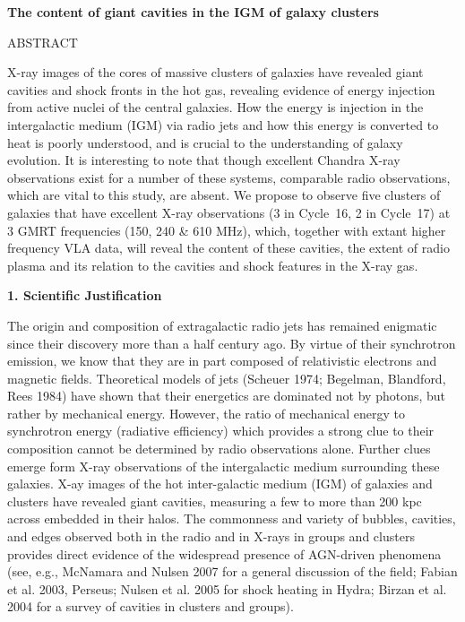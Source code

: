 \documentclass{article}
\begin{document}
 
%


\begin{center}
\large
{\bf The content of giant cavities in the IGM of galaxy clusters}
\normalsize
\end{center}

\bigskip



ABSTRACT {\sf


X-ray images of the cores of massive clusters of galaxies have
revealed giant cavities and shock fronts in the hot gas, revealing
evidence of energy injection from active nuclei of the central
galaxies. How the energy is injection in the intergalactic medium
(IGM) via radio jets and how this energy is converted to heat is
poorly understood, and is crucial to the understanding of galaxy
evolution.  It is interesting to note that though excellent Chandra
X-ray observations exist for a number of these systems, comparable 
radio observations, which are vital to this study,
are absent.
We propose to observe five clusters of galaxies that have
excellent X-ray observations (3 in Cycle~16, 2 in Cycle~17) at 3 GMRT
frequencies (150, 240 \& 610 MHz), which, together with extant higher
frequency VLA data, will reveal the content of these cavities, the
extent of radio plasma and its relation to the cavities and shock
features in the X-ray gas.


	} %





\bigskip


{\bf 1. Scientific Justification}






The origin and composition of extragalactic radio
jets has remained
enigmatic since their discovery more than a half century ago.  By
virtue of their synchrotron emission, we know that they are in part
composed of relativistic electrons and magnetic fields.  Theoretical
models of jets (Scheuer 1974; Begelman, Blandford, Rees 1984) have
shown that their energetics are dominated not by photons, but rather
by mechanical energy.  However, the ratio of mechanical energy to
synchrotron energy (radiative efficiency) which provides a strong clue
to their composition cannot be determined by radio observations alone.
Further clues emerge form X-ray observations of the intergalactic
medium surrounding these galaxies.  X-ay images of the  
hot inter-galactic medium (IGM) of 
galaxies and clusters have revealed giant cavities, measuring a few to
more than 200 kpc across embedded in their halos.  The commonness and
variety of bubbles, cavities, and edges observed both in the radio and
in X-rays in groups and clusters provides direct evidence of the
widespread presence of AGN-driven phenomena (see, e.g., McNamara and
Nulsen 2007 for a general discussion of the field; Fabian et al. 2003,
Perseus; Nulsen et al. 2005 for shock heating in Hydra; Birzan et
al. 2004 for a survey of cavities in clusters and groups).
\end{document}
